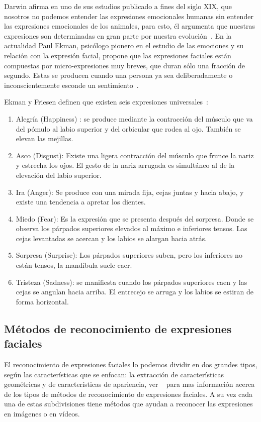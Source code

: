 Darwin afirma en uno de  sus estudios publicado a fines del siglo XIX, que nosotros no podemos entender las expresiones emocionales humanas sin entender las expresiones emocionales de los animales, para esto, él argumenta que nuestras expresiones son determinadas en gran parte por nuestra evolución~\cite{Darwin1956,Darwin1998}. En la actualidad Paul Ekman, psicólogo pionero en el estudio de las emociones y su relación con la expresión facial, propone que las expresiones faciales están compuestas por micro-expresiones muy breves, que duran sólo una fracción de segundo. Estas se producen cuando una persona ya sea deliberadamente o inconscientemente esconde un sentimiento~\cite{Ekman1981}.

Ekman y Friesen definen que existen seis expresiones universales~\cite{Ekman2003}: 

\begin{enumerate}
	\item Alegría (Happiness) : se produce mediante la contracción del músculo que va del pómulo al labio superior y del orbicular que rodea al ojo. También se elevan las mejillas. 
	\item Asco (Disgust): Existe una ligera contracción del músculo que frunce la nariz y estrecha los ojos. El gesto de la nariz arrugada es simultáneo al de la elevación del labio superior. 
	\item Ira (Anger): Se produce con una mirada fija, cejas juntas y hacia abajo, y existe una tendencia a apretar los dientes. 
	\item Miedo (Fear): Es la expresión que se presenta después del sorpresa. Donde se observa los párpados superiores elevados al máximo e inferiores tensos. Las cejas levantadas se acercan y los labios se alargan hacia atrás. 
	\item Sorpresa (Surprise): Los párpados superiores suben, pero los inferiores no están tensos, la mandíbula suele caer. 
	\item Tristeza (Sadness): se manifiesta cuando los párpados superiores caen y las cejas se angulan hacia arriba. El entrecejo se arruga y los labios se estiran de forma horizontal.
\end{enumerate}


\subsection{Métodos de reconocimiento de expresiones faciales}
El reconocimiento de expresiones faciales lo podemos dividir en dos grandes tipos, según las características que se enfocan: la extracción de características geométricas y de características de apariencia, ver ~\cite{Pantic2000,Zeng2009} para mas información acerca de los tipos de métodos de reconocimiento de expresiones faciales. A su vez cada una de estas subdivisiones tiene métodos que ayudan a reconocer las expresiones en imágenes o en vídeos.

